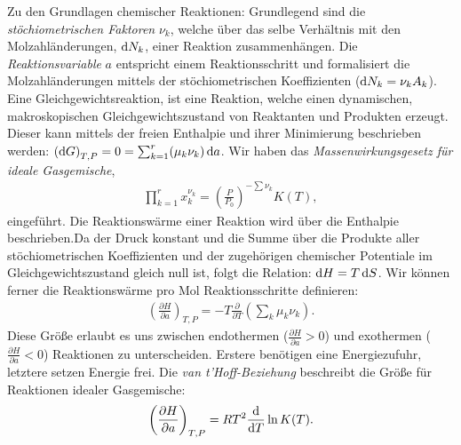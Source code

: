 \begin{summary}
    Zu den Grundlagen chemischer Reaktionen: Grundlegend sind die \emph{stöchiometrischen Faktoren} $\nu_k$, welche über das selbe Verhältnis mit den Molzahländerungen, $\mathop{}\!\mathrm{d} N_k$, einer Reaktion zusammenhängen. Die \emph{Reaktionsvariable} $a$ entspricht einem Reaktionsschritt und formalisiert die Molzahländerungen mittels der stöchiometrischen Koeffizienten ($\mathop{}\!\mathrm{d} N_k=\nu_k A_k$). 
    Eine Gleichgewichtsreaktion, ist eine Reaktion, welche einen dynamischen, makroskopischen Gleichgewichtszustand von Reaktanten und Produkten erzeugt. Dieser kann mittels der freien Enthalpie und ihrer Minimierung beschrieben werden: $\left(\mathop{}\!\mathrm{d} G\right)_{T,P}=0=\sum_{k=1}^{r}(\mu_k\nu_k)\mathop{}\!\mathrm{d} a$.
    Wir haben das \emph{Massenwirkungsgesetz für ideale Gasgemische},
    \begin{align*}
        \prod_{k=1}^{r}x_k^{\nu_k}=\left(\frac{P}{P_0}\right)^{-\sum\nu_k}K(T),
    \end{align*}
    eingeführt.
    Die Reaktionswärme einer Reaktion wird über die Enthalpie beschrieben.Da der Druck konstant und die Summe über die Produkte aller stöchiometrischen Koeffizienten und der zugehörigen chemischer Potentiale im Gleichgewichtszustand gleich null ist, folgt die Relation: $\mathop{}\!\mathrm{d} H=T\mathop{}\!\mathrm{d} S$. Wir können ferner die Reaktionswärme pro Mol Reaktionsschritte definieren:
    \begin{align*}
        \left(\frac{\partial H}{\partial a}\right)_{T,P}=-T\frac{\partial}{\partial T}\left(\sum_{k}\mu_k\nu_k\right).
    \end{align*}
    Diese Größe erlaubt es uns zwischen endothermen ($\frac{\partial H}{\partial a}>0$) und exothermen ($\frac{\partial H}{\partial a}<0$) Reaktionen zu unterscheiden. Erstere benötigen eine Energiezufuhr, letztere setzen Energie frei.
    Die \emph{van t'Hoff-Beziehung} beschreibt die Größe für Reaktionen idealer Gasgemische:
    \begin{align*}
        \left(\frac{\partial H}{\partial a}\right)_{T,P}=RT^2\frac{\mathop{}\!\mathrm{d}}{\mathop{}\!\mathrm{d} T}\ln K(T).
    \end{align*}
\end{summary}